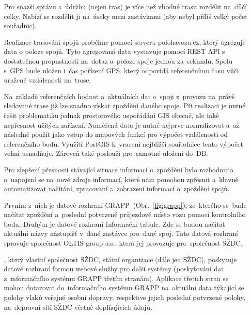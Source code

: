 Pro snazší správu a~údržbu (nejen tras) je více než vhodné trasu rozdělit na~dílčí celky. Nabízí se rozdělit ji na~úseky mezi zastávkami (aby nebyl příliš velký počet souřadnic).

Realizace trasování spojů proběhne pomocí serveru polohavozu.cz, který agreguje data o poloze spojů. Tyto agregovaná data vystavuje pomocí REST API s dostatečnou propustností na~dotaz o~poloze spoje jednou za~sekundu. Spolu s~GPS bude uložen i~čas pořízení GPS, který odpovídá referenčnímu času vůči uražené vzdálenosti na~trase.

Na~základě referenčních hodnot a~aktuálních dat o~spoji z~provozu na~právě sledované trase již lze snadno získat zpoždění daného spoje. Při realizaci je nutné řešit problematiku jednak prostorového uspořádání GIS obecně, ale také nepřesnost užitých zařízení. Naměřená data je nutné nejprve normalizovat a~až následně použít jako vstup do mapových funkcí pro výpočet vzdálenosti od referenčního bodu. Využití PostGIS k~vracení nejbližší souřadnice tento výpočet velmi usnadňuje. Zároveň také poslouží pro~samotné uložení do~DB.


Pro zlepšení přesnosti stávající situace informací o~zpoždění bylo rozhodnuto o~napojení se na~nové zdroje informací, které nám pomohou zpřesnit a~hlavně automatizovat načítání, zpracovaní a~zobrazení informací o~zpoždění spojů.

Prvním z~nich je datové rozhraní GRAPP~(Obr.~\ref{fig:grapp}), ze~kterého se~bude načítat zpoždění a~poslední potvrzené průjezdové místo vozu pomocí kontrolního bodu. Druhým je datové rozhraní Informační tabule. Zde se budou načítat aktuální názvy nástupišť v~dané zastávce pro~daný spoj. Tato datová rozhraní spravuje společnost OLTIS group a.s., která jej provozuje pro~společnost SŽDC.



, který vlastní společnost SŽDC, státní organizace (dále jen SŽDC), poskytuje datové rozhraní formou webové služby pro další systémy (poskytování dat z~informačního systému GRAPP třetím stranám). Aplikace třetích stran se mohou dotazovat do~informačního systému GRAPP na~aktuální data týkající se polohy vlaků veřejné osobní dopravy, respektive jejich poslední potvrzené polohy, na~dopravní síti SŽDC včetně doplňujících údajů.

